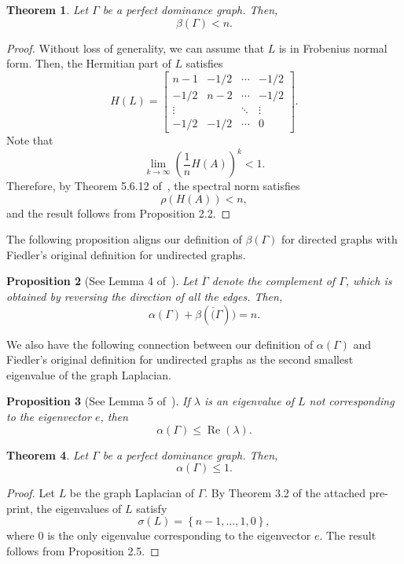 \documentclass{article}
\newtheorem{theorem}{Theorem}[section]
\newtheorem{proposition}[theorem]{Proposition}
\newcommand*\conj[1]{\overline{#1}}
\newcommand\re[1]{\operatorname{Re}\left(#1\right)}
\begin{document}
\begin{theorem}
Let $\Gamma$ be a perfect dominance graph.
Then,
\[
\beta(\Gamma)<n.
\]
\end{theorem}
\begin{proof}
Without loss of generality, we can assume that $L$ is in Frobenius normal form.
Then, the Hermitian part of $L$ satisfies
\[
H(L)=\begin{bmatrix} n-1 & -1/2 & \cdots & -1/2 \\
				-1/2 & n-2 & \cdots & -1/2 \\
				\vdots & & \ddots & \vdots \\
				-1/2 & -1/2 & \cdots & 0 \end{bmatrix}.
\]
Note that
\[
\lim_{k\rightarrow\infty}\left(\frac{1}{n}H(A)\right)^{k} < 1.
\]
Therefore, by Theorem 5.6.12 of~\cite{Horn2013}, the spectral norm satisfies
\[
\rho(H(A))<n,
\]
and the result follows from Proposition 2.2. 
\end{proof}

The following proposition aligns our definition of $\beta(\Gamma)$ for directed graphs with Fiedler's original definition for undirected graphs.

\begin{proposition}[See Lemma 4 of~\cite{Wu2005-1}]
Let $\conj{\Gamma}$ denote the complement of $\Gamma$, which is obtained by reversing the direction of all the edges.
Then,
\[
\alpha(\Gamma)+\beta(\conj(\Gamma))=n.
\]
\end{proposition}

We also have the following connection between our definition of $\alpha(\Gamma)$ and Fiedler's original definition for undirected graphs as the second smallest eigenvalue of the graph Laplacian.

\begin{proposition}[See Lemma 5 of~\cite{Wu2005-1}]
If $\lambda$ is an eigenvalue of $L$ not corresponding to the eigenvector $e$, then
\[
\alpha(\Gamma)\leq\re{\lambda}.
\]
\end{proposition}

\begin{theorem}
Let $\Gamma$ be a perfect dominance graph.
Then,
\[
\alpha(\Gamma)\leq 1.
\]
\end{theorem}
\begin{proof}
Let $L$ be the graph Laplacian of $\Gamma$. 
By Theorem 3.2 of the attached pre-print, the eigenvalues of $L$ satisfy
\[
\sigma(L)=\left\{n-1,\ldots,1,0\right\},
\]
where $0$ is the only eigenvalue corresponding to the eigenvector $e$. 
The result follows from Proposition 2.5.
\end{proof}
\end{document}
